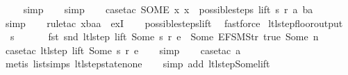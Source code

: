 \begin{isabellebody}
\ \ \ \isamarkupfalse%
\ simp\isanewline
\ \ \isamarkupfalse%
\ simp\isanewline
\ \ \isamarkupfalse%
\ {\isacharparenleft}case{\isacharunderscore}tac\ {\isachardoublequoteopen}SOME\ x{\isachardot}\ x\ {\isacharbar}{\isasymin}{\isacharbar}\ possible{\isacharunderscore}steps\ lift\ s\ r\ a\ ba{\isachardoublequoteclose}{\isacharparenright}\isanewline
\ \ \isamarkupfalse%
\ simp\isanewline
\ \ \isamarkupfalse%
\ {\isacharparenleft}rule{\isacharunderscore}tac\ x{\isacharequal}baa\ \ exI{\isacharparenright}\isanewline
\ \ \isamarkupfalse%
\ possible{\isacharunderscore}steps{\isacharunderscore}lift\ \isamarkupfalse%
\ fastforce%
\endisatagproof
{\isafoldproof}%
%
\isadelimproof
\isanewline
%
\endisadelimproof
\isanewline
{}\isamarkupfalse%
\ ltl{\isacharunderscore}step{\isacharunderscore}floor{\isacharunderscore}output{\isacharcolon}\isanewline
\ \ {\isachardoublequoteopen}s\ {\isasymin}\ {\isacharbraceleft}{}{\isacharcomma}\ {}{\isacharcomma}\ {}{\isacharcomma}\ {}{\isacharbraceright}\ {\isasymLongrightarrow}\ fst\ {\isacharparenleft}snd\ {\isacharparenleft}ltl{\isacharunderscore}step\ lift\ {\isacharparenleft}Some\ s{\isacharparenright}\ r\ e{\isacharparenright}{\isacharparenright}\ {\isasymnoteq}\ {\isacharbrackleft}Some\ {\isacharparenleft}EFSM{\isachardot}Str\ {\isacharprime}{\isacharprime}true{\isacharprime}{\isacharprime}{\isacharparenright}{\isacharcomma}\ Some\ n{\isacharbrackright}{\isachardoublequoteclose}\isanewline
%
\isadelimproof
\ \ %
\endisadelimproof
%
\isatagproof
{}\isamarkupfalse%
\ {\isacharparenleft}case{\isacharunderscore}tac\ {\isachardoublequoteopen}ltl{\isacharunderscore}step\ lift\ {\isacharparenleft}Some\ s{\isacharparenright}\ r\ e{\isachardoublequoteclose}{\isacharparenright}\isanewline
\ \ \isamarkupfalse%
\ simp\isanewline
\ \ \isamarkupfalse%
\ {\isacharparenleft}case{\isacharunderscore}tac\ a{\isacharparenright}\isanewline
\ \ \ \isamarkupfalse%
\ {\isacharparenleft}metis\ list{\isachardot}simps{\isacharparenleft}{}{\isacharparenright}\ ltl{\isacharunderscore}step{\isacharunderscore}state{\isacharunderscore}none{\isacharparenright}\isanewline
\ \ \isamarkupfalse%
\ {\isacharparenleft}simp\ add{\isacharcolon}\ ltl{\isacharunderscore}step{\isacharunderscore}Some{\isacharunderscore}lift{\isacharparenright}\isanewline
\ \ \isamarkupfalse%

\end{isabellebody}

